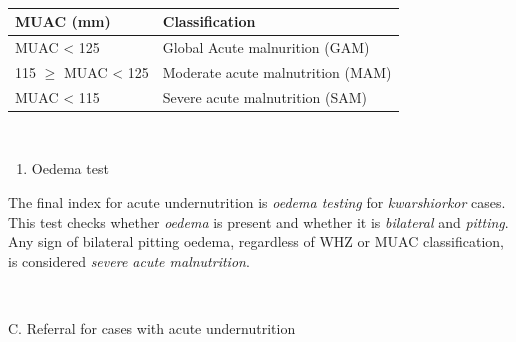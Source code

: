 \documentclass[12pt,]{book}
\providecommand{\tightlist}{%
  \setlength{\itemsep}{0pt}\setlength{\parskip}{0pt}}
\theoremstyle{definition}
\theoremstyle{definition}
\theoremstyle{definition}
\theoremstyle{remark}
\begin{document}
~

\begin{longtable}[]{@{}ll@{}}
\toprule
\begin{minipage}[b]{0.34\columnwidth}\raggedright
\textbf{MUAC (mm)}\strut
\end{minipage} & \begin{minipage}[b]{0.47\columnwidth}\raggedright
\textbf{Classification}\strut
\end{minipage}\tabularnewline
\midrule
\endhead
\begin{minipage}[t]{0.34\columnwidth}\raggedright
MUAC \textless{} 125\strut
\end{minipage} & \begin{minipage}[t]{0.47\columnwidth}\raggedright
Global Acute malnurition (GAM)\strut
\end{minipage}\tabularnewline
\begin{minipage}[t]{0.34\columnwidth}\raggedright
115 \(\geq\) MUAC \textless{} 125\strut
\end{minipage} & \begin{minipage}[t]{0.47\columnwidth}\raggedright
Moderate acute malnutrition (MAM)\strut
\end{minipage}\tabularnewline
\begin{minipage}[t]{0.34\columnwidth}\raggedright
MUAC \textless{} 115\strut
\end{minipage} & \begin{minipage}[t]{0.47\columnwidth}\raggedright
Severe acute malnutrition (SAM)\strut
\end{minipage}\tabularnewline
\bottomrule
\end{longtable}

~

\begin{enumerate}
\def\labelenumi{\arabic{enumi}.}
\setcounter{enumi}{2}
\tightlist
\item
  Oedema test
\end{enumerate}

The final index for acute undernutrition is \emph{oedema testing} for
\emph{kwarshiorkor} cases. This test checks whether \emph{oedema} is
present and whether it is \emph{bilateral} and \emph{pitting}. Any sign
of bilateral pitting oedema, regardless of WHZ or MUAC classification,
is considered \emph{severe acute malnutrition}.

~

C. Referral for cases with acute undernutrition
\end{document}
